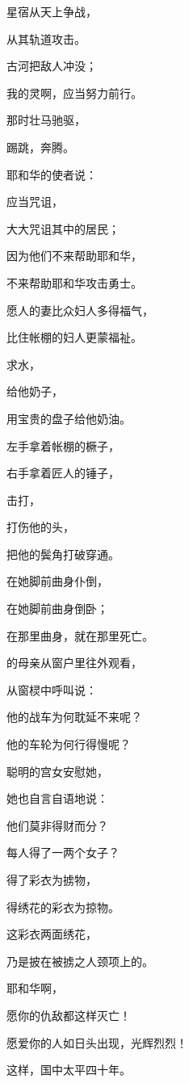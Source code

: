 {\par }{\Q {}星宿从天上争战，
\par }{\Q 从其轨道攻击{}。
\par }{\Q {}古河把敌人冲没；
\par }{\Q 我的灵啊，应当努力前行。
\par }{\Q {}那时壮马驰驱，
\par }{\Q 踢跳，奔腾。
\par }{\BB \par }{\Q {}耶和华的使者说：
\par }{\Q 应当咒诅{}，
\par }{\Q 大大咒诅其中的居民；
\par }{\Q 因为他们不来帮助耶和华，
\par }{\Q 不来帮助耶和华攻击勇士。
\par }{\BB \par }{\Q {}愿{}人{}的妻{}比众妇人多得福气，
\par }{\Q 比住帐棚的妇人更蒙福祉。
\par }{\Q {}求水，
\par }{给他奶子，
\par }{\Q 用宝贵的盘子给他奶油。
\par }{\Q {}左手拿着帐棚的橛子，
\par }{\Q 右手拿着匠人的锤子，
\par }{\Q 击打{}，
\par }{\Q 打伤他的头，
\par }{\Q 把他的鬓角打破穿通。
\par }{\Q {}在她脚前曲身仆倒，
\par }{\Q 在她脚前曲身倒卧；
\par }{\Q 在那里曲身，就在那里死亡。
\par }{\BB \par }{\Q {}的母亲从窗户里往外观看，
\par }{\Q 从窗棂中呼叫说：
\par }{\Q 他的战车为何耽延不来呢？
\par }{\Q 他的车轮为何行得慢呢？
\par }{\Q {}聪明的宫女安慰她，
\par }{\Q 她也自言自语地说：
\par }{\Q {}他们莫非得财而分？
\par }{\Q 每人得了一两个女子？
\par }{得了彩衣为掳物，
\par }{\Q 得绣花的彩衣为掠物。
\par }{\Q 这彩衣两面绣花，
\par }{\Q 乃是披在被掳之人颈项上的。
\par }{\Q {}耶和华啊，
\par }{\Q 愿你的仇敌都这样灭亡！
\par }{\Q 愿爱你的人如日头出现，光辉烈烈！
\par }{\BB \par }{\Q 这样，国中太平四十年。

}
